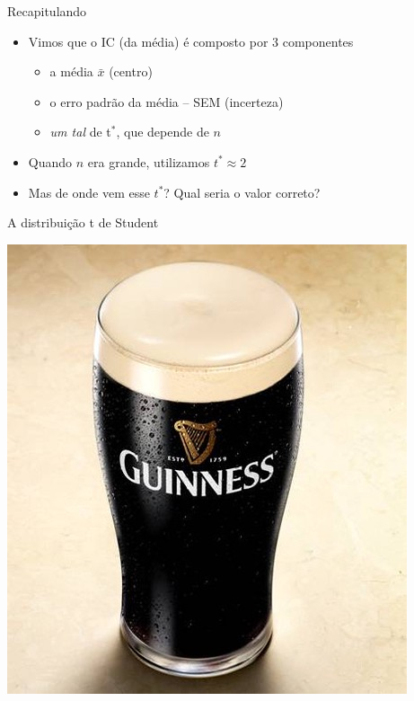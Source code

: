 \documentclass{beamer}
\begin{document}
\begin{frame}{\scriptsize Recapitulando}
  \begin{itemize}
    \footnotesize
  \item Vimos que o IC {\tiny(da média)} é composto por 3 componentes
    \begin{itemize}
      \scriptsize
    \item a média $\bar{x}$ {\tiny(centro)}
    \item o erro padrão da média -- SEM {\tiny(incerteza)}
    \item {\em um tal} de t$^{*}$, que depende de $n$
    \end{itemize}
  \item Quando $n$ era grande, utilizamos $t^{*} \approx 2$
    \bigskip
  \item Mas de onde vem esse $t^{*}$? Qual seria o valor \alert{correto}?
  \end{itemize}
\end{frame}

\begin{frame}{\scriptsize A distribuição t de Student}
  \begin{center}
    \includegraphics[height=\textheight]{Cap5/Guinness}
  \end{center}
\end{frame}
\end{document}
